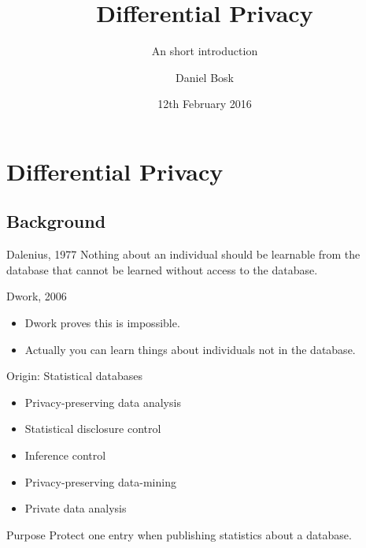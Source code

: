 \title{Differential Privacy}
\subtitle{An short introduction}
\author[D. Bosk <dbosk@kth.se>]{Daniel Bosk}
\date{12th February 2016}

\maketitle

\mode*

\begin{abstract}
  
\end{abstract}


\section{Differential Privacy}

\subsection{Background}

\begin{frame}
  \begin{block}{Dalenius, 1977}
    Nothing about an individual should be learnable from the database that 
    cannot be learned without access to the database.
  \end{block}

  \pause{}

  \begin{block}{Dwork, 2006}
    \begin{itemize}
      \item Dwork proves this is impossible.
      \item Actually you can learn things about individuals not in the 
        database.
    \end{itemize}
  \end{block}
\end{frame}

\begin{frame}
  \begin{block}{Origin: Statistical databases}
    \begin{itemize}
      \item Privacy-preserving data analysis
      \item Statistical disclosure control
      \item Inference control
      \item Privacy-preserving data-mining
      \item Private data analysis
    \end{itemize}
  \end{block}

  \pause{}

  \begin{block}{Purpose}
    Protect one entry when publishing statistics about a database.
  \end{block}
\end{frame}

